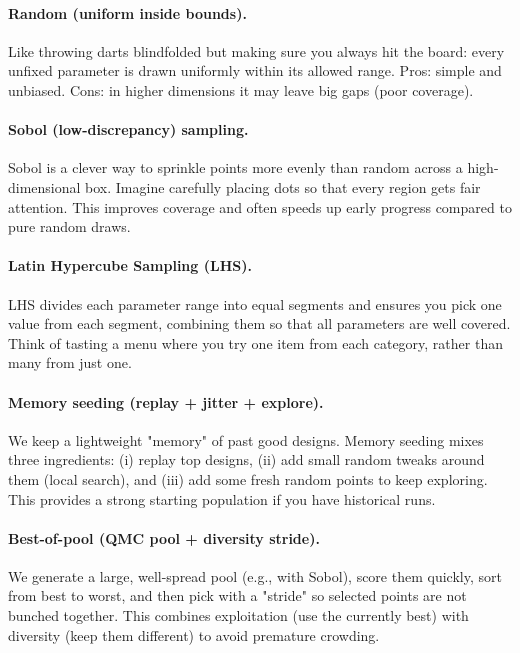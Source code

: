 \documentclass[12pt,a4paper]{article}
\begin{document}
\paragraph{Random (uniform inside bounds).}
Like throwing darts blindfolded but making sure you always hit the board: every unfixed parameter is drawn uniformly within its allowed range. Pros: simple and unbiased. Cons: in higher dimensions it may leave big gaps (poor coverage).

\paragraph{Sobol (low-discrepancy) sampling.}
Sobol is a clever way to sprinkle points more evenly than random across a high-dimensional box. Imagine carefully placing dots so that every region gets fair attention. This improves coverage and often speeds up early progress compared to pure random draws.

\paragraph{Latin Hypercube Sampling (LHS).}
LHS divides each parameter range into equal segments and ensures you pick one value from each segment, combining them so that all parameters are well covered. Think of tasting a menu where you try one item from each category, rather than many from just one.

\paragraph{Memory seeding (replay + jitter + explore).}
We keep a lightweight "memory" of past good designs. Memory seeding mixes three ingredients: (i) replay top designs, (ii) add small random tweaks around them (local search), and (iii) add some fresh random points to keep exploring. This provides a strong starting population if you have historical runs.

\paragraph{Best-of-pool (QMC pool + diversity stride).}
We generate a large, well-spread pool (e.g., with Sobol), score them quickly, sort from best to worst, and then pick with a "stride" so selected points are not bunched together. This combines exploitation (use the currently best) with diversity (keep them different) to avoid premature crowding.
\end{document}
